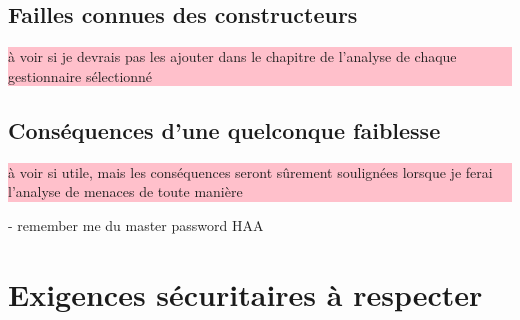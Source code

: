 \subsection{Failles connues des constructeurs}
\colorbox{pink}{\parbox{15cm}{à voir si je devrais pas les ajouter dans le chapitre de l'analyse de chaque gestionnaire sélectionné}}
\subsection{Conséquences d'une quelconque faiblesse}
\colorbox{pink}{\parbox{15cm}{à voir si utile, mais les conséquences seront sûrement soulignées lorsque je ferai l'analyse de menaces de toute manière}}
- remember me du master password HAA
\section{Exigences sécuritaires à respecter} 
